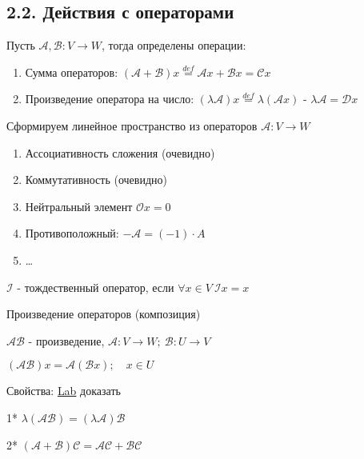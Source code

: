 \documentclass[12pt]{article}
\begin{document}
    \subsection{2.2. Действия с операторами}

    \Def Пусть $\mathcal{A}, \mathcal{B}: V \rightarrow W$, тогда определены операции:

    \begin{enumerate}
        \item Сумма операторов: $(\mathcal{A} + \mathcal{B})x \stackrel{def}{=} \mathcal{A}x + \mathcal{B}x = \mathcal{C}x$
        \item Произведение оператора на число: $(\lambda\mathcal{A})x \stackrel{def}{=} \lambda(\mathcal{A}x)$ - $\lambda\mathcal{A} = \mathcal{D}x$
    \end{enumerate}

    \Nota Сформируем линейное пространство из операторов $\mathcal{A}: V \rightarrow W$

    \begin{enumerate}
        \item Ассоциативность сложения (очевидно)
        \item Коммутативность (очевидно)
        \item Нейтральный элемент $\mathcal{O}x = 0$
        \item Противоположный: $-\mathcal{A} = (-1) \cdot A$
        \item \dots \Lab
    \end{enumerate}

    \Def $\mathcal{I}$ - тождественный оператор, если $\forall x \in V \ \mathcal{I}x = x$


    \Def Произведение операторов (композиция)

    $\mathcal{A}\mathcal{B}$ - произведение, $\mathcal{A} : V \rightarrow W; \ \mathcal{B} : U \rightarrow V$

    $(\mathcal{A}\mathcal{B}) x = \mathcal{A}(\mathcal{B}x); \quad x \in U$

    \hypertarget{linearoperatorproperties}{}

    Свойства: \underline{Lab} доказать

    1* $\lambda (\mathcal{A}\mathcal{B}) = (\lambda \mathcal{A})\mathcal{B}$

    2* $(\mathcal{A} + \mathcal{B}) \mathcal{C} = \mathcal{A}\mathcal{C} + \mathcal{B}\mathcal{C}$
\end{document}
